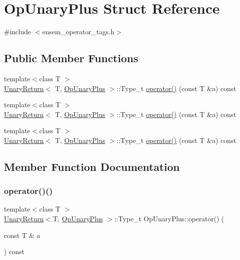 \hypertarget{structOpUnaryPlus}{}\section{Op\+Unary\+Plus Struct Reference}
\label{structOpUnaryPlus}


{\ttfamily \#include $<$ensem\+\_\+operator\+\_\+tags.\+h$>$}

\subsection*{Public Member Functions}
\begin{DoxyCompactItemize}
\item 
{\footnotesize template$<$class T $>$ }\\\mbox{\hyperlink{structUnaryReturn}{Unary\+Return}}$<$ T, \mbox{\hyperlink{structOpUnaryPlus}{Op\+Unary\+Plus}} $>$\+::Type\+\_\+t \mbox{\hyperlink{structOpUnaryPlus_ad54a5d02fba52ca6cf35871d36aefab4}{operator()}} (const T \&a) const
\item 
{\footnotesize template$<$class T $>$ }\\\mbox{\hyperlink{structUnaryReturn}{Unary\+Return}}$<$ T, \mbox{\hyperlink{structOpUnaryPlus}{Op\+Unary\+Plus}} $>$\+::Type\+\_\+t \mbox{\hyperlink{structOpUnaryPlus_ad54a5d02fba52ca6cf35871d36aefab4}{operator()}} (const T \&a) const
\item 
{\footnotesize template$<$class T $>$ }\\\mbox{\hyperlink{structUnaryReturn}{Unary\+Return}}$<$ T, \mbox{\hyperlink{structOpUnaryPlus}{Op\+Unary\+Plus}} $>$\+::Type\+\_\+t \mbox{\hyperlink{structOpUnaryPlus_ad54a5d02fba52ca6cf35871d36aefab4}{operator()}} (const T \&a) const
\end{DoxyCompactItemize}


\subsection{Member Function Documentation}
\mbox{\label{structOpUnaryPlus_ad54a5d02fba52ca6cf35871d36aefab4}} 
\subsubsection{\texorpdfstring{operator()()}{operator()()}\hspace{0.1cm}{\footnotesize\ttfamily [1/3]}}
{\footnotesize\ttfamily template$<$class T $>$ \\
\mbox{\hyperlink{structUnaryReturn}{Unary\+Return}}$<$T, \mbox{\hyperlink{structOpUnaryPlus}{Op\+Unary\+Plus}} $>$\+::Type\+\_\+t Op\+Unary\+Plus\+::operator() (\begin{DoxyParamCaption}\item[{const T \&}]{a }\end{DoxyParamCaption}) const\hspace{0.3cm}{\ttfamily [inline]}}

